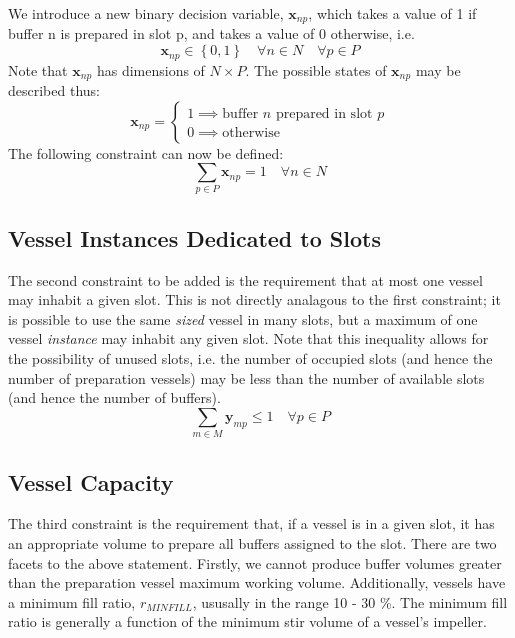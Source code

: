 We introduce a new binary decision variable, $\boldsymbol{x}_{np}$, which takes
a value of 1 if buffer n is prepared in slot p, and takes a value of 0
otherwise, i.e.
\begin{equation}
    \boldsymbol{x}_{np} \in \left\{ 0, 1 \right\} \quad \forall n \in N \quad
    \forall p \in P
    \label{eq.x}
\end{equation}
Note that $\boldsymbol{x}_{np}$ has dimensions of $N \times P$.
The possible states of $\boldsymbol{x}_{np}$ may be described thus:
\begin{equation}
    \boldsymbol{x}_{np} =
    \begin{cases}
        1 \implies \text{buffer $n$ prepared in slot $p$}\\
        0 \implies \text{otherwise}
    \end{cases}
\end{equation}
The following constraint can now be defined:
\begin{equation}
    \sum_{p \in P} \boldsymbol{x}_{np} = 1 \quad \forall n \in N
    \label{eq.constr1}
\end{equation}

\subsection{Vessel Instances Dedicated to Slots}\label{SS.constr2}

The second constraint to be added is the requirement that at most one vessel
may inhabit a given slot.
This is not directly analagous to the first constraint; it is possible to
use the same \emph{sized} vessel in many slots, but a maximum of one vessel
\emph{instance} may inhabit any given slot.
Note that this inequality allows for the possibility of unused slots, i.e. the
number of occupied slots (and hence the number of preparation vessels) may be
less than the number of available slots (and hence the number of buffers).
\begin{equation}
    \sum_{m \in M} \boldsymbol{y}_{mp} \le 1 \quad \forall p \in P
    \label{eq.constr2}
\end{equation}

\subsection{Vessel Capacity}\label{SS.constr3}

The third constraint is the requirement that, if a vessel is in a given slot,
it has an appropriate volume to prepare all buffers assigned to the slot.
There are two facets to the above statement.
Firstly, we cannot produce buffer volumes greater than the preparation vessel
maximum working volume.
Additionally, vessels have a minimum fill ratio, $r_{MINFILL}$, ususally in the
range 10 - 30 \%.
The minimum fill ratio is generally a function of the minimum stir volume of a
vessel's impeller.

